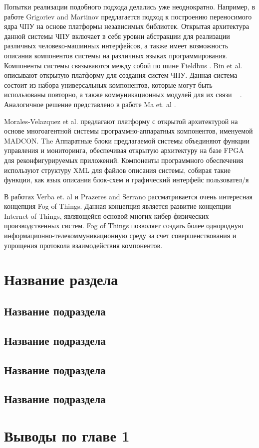 Попытки реализации подобного подхода делались уже неоднократно. Например, в работе Grigoriev and Martinov предлагается подход к построению переносимого ядра ЧПУ на основе платформы независимых библиотек. Открытая архитектура данной системы ЧПУ включает в себя уровни абстракции для реализации различных человеко-машинных интерфейсов, а также имеет возможность описания компонентов системы на различных языках программирования. Компоненты системы связываются между собой по шине Fieldbus
.
Bin et al. описывают открытую платформу для создания систем ЧПУ. Данная система состоит из набора универсальных компонентов, которые могут быть использованы повторно, а также коммуникационных модулей для их связи%
~\cite{bin2004research}
.  Аналогичное решение представлено в работе Ma et. al
.

Morales-Velazquez et al. предлагают платформу с открытой архитектурой на основе многоагентной системы программно-аппаратных компонентов, именуемой MADCON. The Аппаратные блоки предлагаемой системы объединяют функции управления и мониторинга, обеспечивая открытую архитектуру на базе FPGA для реконфигурируемых приложений. Компоненты программного обеспечения используют структуру XML для файлов описания системы, собирая такие функции, как язык описания блок-схем и графический интерфейс пользовател/я%

В работах Verba et. al
и  Prazeres and Serrano
рассматривается очень интересная концепция Fog of Things. Данная концепция является развитие концепции Internet of Things, являющейся основой многих кибер-физических производственных систем. Fog of Things позволяет создать более однородную информационно-телекоммуникационную среду за счет совершенствования и упрощения протокола взаимодействия компонентов.

\section{Название раздела}\label{sec:ch1/sec3}

\subsection{Название подраздела}\label{subsec:ch1/sec3/sub1}

\subsection{Название подраздела}\label{subsec:ch1/sec3/sub2}

\subsection{Название подраздела}\label{subsec:ch1/sec3/sub3}

\subsection{Название подраздела}\label{subsec:ch1/sec3/sub4}

\section{Выводы по главе 1}

\FloatBarrier
